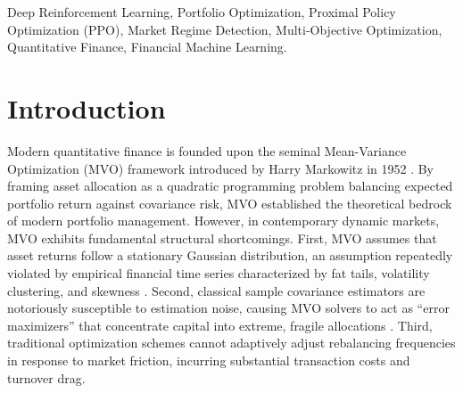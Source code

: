 \documentclass[conference]{IEEEtran}
\begin{document}
\begin{abstract}
Dynamic portfolio allocation is challenging under changing market conditions, estimation uncertainty, and trading costs. This study implements and evaluates a portfolio allocation framework that combines Proximal Policy Optimization (PPO) with deterministic market-regime features. The framework is compared with Equal Weight, Buy \& Hold, rolling Markowitz Mean-Variance Optimization (MVO), and a PPO ablation without regime inputs. Five large-cap U.S. equities (AAPL, MSFT, GOOGL, AMZN, and NVDA) are evaluated using daily market data from January 2016 through November 25, 2026. The latest out-of-sample evaluation covers January 2, 2024 through November 25, 2026 (729 observations), with a 10-basis-point transaction-cost assumption and INR 1,000,000 initial capital. Markowitz MVO achieved the highest observed CAGR (37.53\%) and Sharpe ratio (1.300), while Regime-Aware PPO had the lowest maximum drawdown among the tested strategies (26.43\%). Regime-Aware PPO outperformed the PPO ablation in CAGR (28.21\% versus 26.66\%), but its turnover and transaction costs were substantially higher. These findings are descriptive results from a single historical test window and do not establish statistical significance or future performance.
\end{abstract}

\begin{IEEEkeywords}
Deep Reinforcement Learning, Portfolio Optimization, Proximal Policy Optimization (PPO), Market Regime Detection, Multi-Objective Optimization, Quantitative Finance, Financial Machine Learning.
\end{IEEEkeywords}

\section{Introduction}
Modern quantitative finance is founded upon the seminal Mean-Variance Optimization (MVO) framework introduced by Harry Markowitz in 1952 \cite{markowitz1952portfolio}. By framing asset allocation as a quadratic programming problem balancing expected portfolio return against covariance risk, MVO established the theoretical bedrock of modern portfolio management. However, in contemporary dynamic markets, MVO exhibits fundamental structural shortcomings. First, MVO assumes that asset returns follow a stationary Gaussian distribution, an assumption repeatedly violated by empirical financial time series characterized by fat tails, volatility clustering, and skewness \cite{mandelbrot1963variation, cont2001empirical}. Second, classical sample covariance estimators are notoriously susceptible to estimation noise, causing MVO solvers to act as ``error maximizers'' that concentrate capital into extreme, fragile allocations \cite{michaud1989markowitz}. Third, traditional optimization schemes cannot adaptively adjust rebalancing frequencies in response to market friction, incurring substantial transaction costs and turnover drag.
\end{document}
